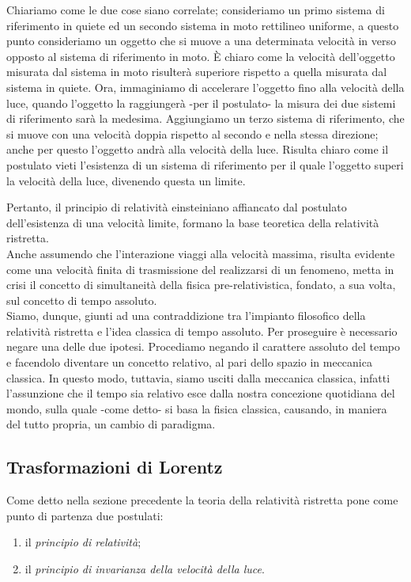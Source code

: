 Chiariamo come le due cose siano correlate; consideriamo un primo sistema di riferimento in quiete ed un secondo sistema in moto rettilineo uniforme, a questo punto consideriamo un oggetto che si muove a una determinata velocità in verso opposto al sistema di riferimento in moto. \`E chiaro come la velocità dell'oggetto misurata dal sistema in moto risulterà superiore rispetto a quella misurata dal sistema in quiete. Ora, immaginiamo di accelerare l'oggetto fino alla velocità della luce, quando l'oggetto la raggiungerà -per il postulato- la misura dei due sistemi di riferimento sarà la medesima. Aggiungiamo un terzo sistema di riferimento, che si muove con una velocità doppia rispetto al secondo e nella stessa direzione; anche per questo l'oggetto andrà alla velocità della luce. Risulta chiaro come il postulato vieti l'esistenza di un sistema di riferimento per il quale l'oggetto superi la velocità della luce, divenendo questa un limite. 

Pertanto, il principio di relatività einsteiniano affiancato dal postulato dell'esistenza di una velocità limite, formano la base teoretica della relatività ristretta.\\
Anche assumendo che l'interazione viaggi alla velocità massima, risulta evidente come una velocità finita di trasmissione del realizzarsi di un fenomeno, metta in crisi il concetto di simultaneità della fisica pre-relativistica, fondato, a sua volta, sul concetto di tempo assoluto.\\
Siamo, dunque, giunti ad una contraddizione tra l'impianto filosofico della relatività ristretta e l'idea classica di tempo assoluto. Per proseguire è necessario negare una delle due ipotesi.
Procediamo negando il carattere assoluto del tempo e facendolo diventare un concetto relativo, al pari dello spazio in meccanica classica.
In questo modo, tuttavia, siamo usciti dalla meccanica classica, infatti l'assunzione che il tempo sia relativo esce dalla nostra concezione quotidiana del mondo, sulla quale -come detto- si basa la fisica classica, causando, in maniera del tutto propria, un cambio di paradigma.
\subsection{Trasformazioni di Lorentz}\label{sec:1.1}
Come detto nella sezione precedente la teoria della relatività ristretta pone come punto di partenza due postulati:
\begin{enumerate}
    \item il \textit{principio di relatività};
    \item il \textit{principio di invarianza della velocità della luce}.
\end{enumerate}

